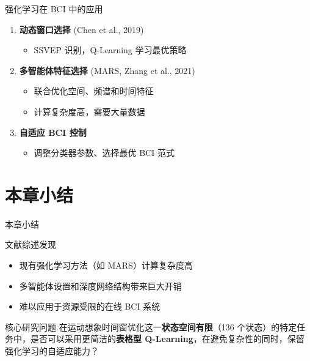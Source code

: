 \begin{frame}{强化学习在 BCI 中的应用}
    \begin{enumerate}
        \item \textbf{动态窗口选择} (Chen et al., 2019)
        \begin{itemize}
            \item SSVEP 识别，Q-Learning 学习最优策略
        \end{itemize}
        
        \item \textbf{多智能体特征选择} (MARS, Zhang et al., 2021)
        \begin{itemize}
            \item 联合优化空间、频谱和时间特征
            \item 计算复杂度高，需要大量数据
        \end{itemize}
        
        \item \textbf{自适应 BCI 控制}
        \begin{itemize}
            \item 调整分类器参数、选择最优 BCI 范式
        \end{itemize}
    \end{enumerate}
\end{frame}

\section{本章小结}

\begin{frame}{本章小结}
    \begin{block}{文献综述发现}
        \begin{itemize}
            \item 现有强化学习方法（如 MARS）计算复杂度高
            \item 多智能体设置和深度网络结构带来巨大开销
            \item 难以应用于资源受限的在线 BCI 系统
        \end{itemize}
    \end{block}
    
    \vspace{0.5cm}
    \begin{alertblock}{核心研究问题}
        在运动想象时间窗优化这一\textbf{状态空间有限}（136 个状态）的特定任务中，是否可以采用更简洁的\textbf{表格型 Q-Learning}，在避免复杂性的同时，保留强化学习的自适应能力？
    \end{alertblock}
\end{frame}
